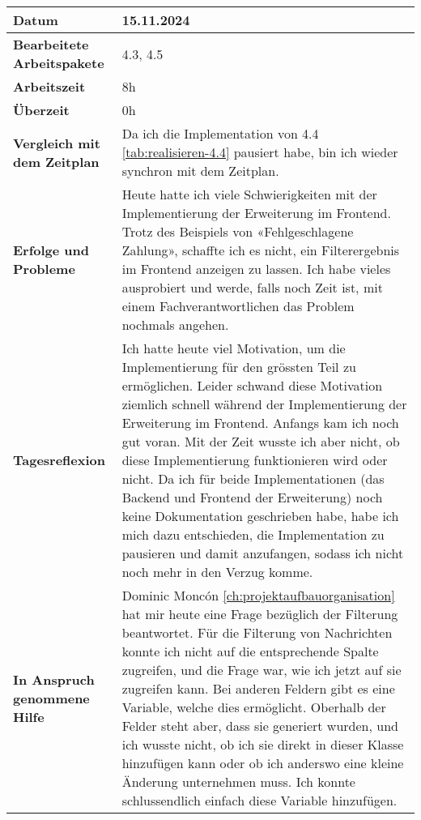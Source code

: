 \begin{longtable}{p{}|p{}}
	\hline
	\textbf{Datum}                       & 15.11.2024            \\
	\hline
	\textbf{Bearbeitete Arbeitspakete}   & 4.3, 4.5                  \\
	\hline
	\textbf{Arbeitszeit}                 & 8h                                    \\
	\hline
	\textbf{Überzeit}                    & 0h                                    \\
	\hline
	\textbf{Vergleich mit dem Zeitplan}  & Da ich die Implementation von 4.4 \ref{tab:realisieren-4.4} pausiert habe, bin ich wieder synchron mit dem Zeitplan. \\
	\hline
	\textbf{Erfolge und Probleme} & Heute hatte ich viele Schwierigkeiten mit der Implementierung der Erweiterung im Frontend. Trotz des Beispiels von «Fehlgeschlagene Zahlung», schaffte ich es nicht, ein Filterergebnis im Frontend anzeigen zu lassen. Ich habe vieles ausprobiert und werde, falls noch Zeit ist, mit einem Fachverantwortlichen das Problem nochmals angehen.
	\\
	\hline
	\textbf{Tagesreflexion} & Ich hatte heute viel Motivation, um die Implementierung für den grössten Teil zu ermöglichen. Leider schwand diese Motivation ziemlich schnell während der Implementierung der Erweiterung im Frontend. Anfangs kam ich noch gut voran. Mit der Zeit wusste ich aber nicht, ob diese Implementierung funktionieren wird oder nicht. Da ich für beide Implementationen (das Backend und Frontend der Erweiterung) noch keine Dokumentation geschrieben habe, habe ich mich dazu entschieden, die Implementation zu pausieren und damit anzufangen, sodass ich nicht noch mehr in den Verzug komme.
	\\
	\hline
	\textbf{In Anspruch genommene Hilfe} & Dominic Moncón \ref{ch:projektaufbauorganisation} hat mir heute eine Frage bezüglich der Filterung beantwortet. Für die Filterung von Nachrichten konnte ich nicht auf die entsprechende Spalte zugreifen, und die Frage war, wie ich jetzt auf sie zugreifen kann. Bei anderen Feldern gibt es eine Variable, welche dies ermöglicht. Oberhalb der Felder steht aber, dass sie generiert wurden, und ich wusste nicht, ob ich sie direkt in dieser Klasse hinzufügen kann oder ob ich anderswo eine kleine Änderung unternehmen muss. Ich konnte schlussendlich einfach diese Variable hinzufügen.                           \\
	\hline
\end{longtable}\label{tab:arbeitsprotokoll-15.11.2024}
\newpage

